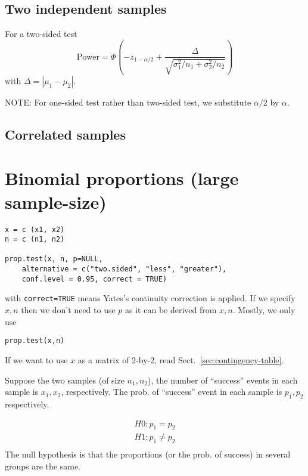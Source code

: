 \subsection{Two independent samples}
\label{sec:two-indep-sampl-1}


For a two-sided test
\begin{equation}
  \label{eq:93}
  \text{Power} = \Phi \left( -z_{1-\alpha/2} +
    \frac{\Delta}{\sqrt{\sigma_1^2/n_1+\sigma_2^2/n_2}} 
\right)
\end{equation}
with $\Delta = |\mu_1-\mu_2|$.


NOTE: For one-sided test rather than two-sided test, we substitute
$\alpha/2$ by $\alpha$. 

\subsection{Correlated samples}
\label{sec:correlated-samples}


\section[Proportional test]{Binomial proportions (large sample-size)}
\label{sec:binomial-proportions}


\begin{lstlisting}
x = c (x1, x2)
n = c (n1, n2)

prop.test(x, n, p=NULL, 
    alternative = c("two.sided", "less", "greater"),
    conf.level = 0.95, correct = TRUE)
\end{lstlisting}
with \verb!correct=TRUE! means Yates's continuity correction is
applied. If we specify $x,n$ then we don't need to use $p$ as it can
be derived from $x,n$. Mostly, we only use
\begin{lstlisting}
prop.test(x,n)
\end{lstlisting}
If we want to use $x$ as a matrix of 2-by-2, read
Sect.~\ref{sec:contingency-table}. 


Suppose the two samples (of size $n_1, n_2$), the number of
``success'' events in each sample is $x_1, x_2$, respectively. The
prob. of ``success'' event in each sample is $p_1,p_2$ respectively.

\begin{eqnarray*}
  H0: p_1 = p_2 \\
  H1: p_1 \ne p_2 \\
\end{eqnarray*}
The null hypothesis is that the proportions (or the prob. of success)
in several groups are the same. 

